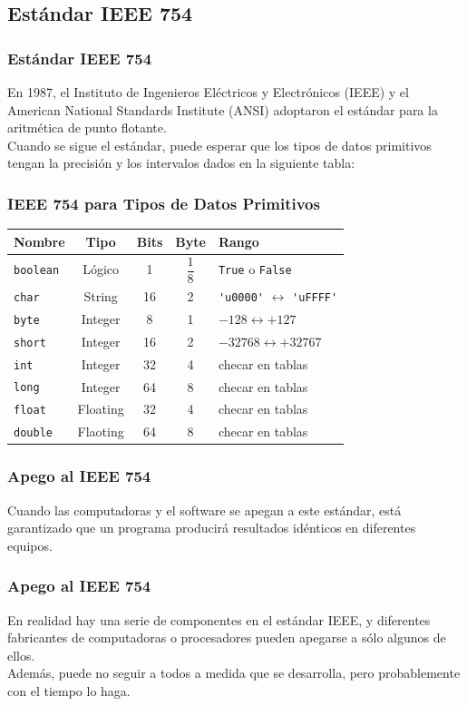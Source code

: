 \subsection{Estándar IEEE 754}
\begin{frame}
\frametitle{Estándar IEEE 754}
En 1987, el Instituto de Ingenieros Eléctricos y Electrónicos (IEEE) y el American National Standards Institute (ANSI) adoptaron el estándar  para la aritmética de punto flotante.
\\
\bigskip
Cuando se sigue el estándar, puede esperar que los tipos de datos primitivos tengan la precisión y los intervalos dados en la siguiente tabla:
\end{frame}
\begin{frame}[fragile]
\frametitle{IEEE 754 para Tipos de Datos Primitivos}
\begin{table}
\fontsize{10}{10}\selectfont
\begin{tabular}{l c c c l}
\hline
Nombre & Tipo & Bits & Byte & Rango \\ \hline
\texttt{boolean} & Lógico & 1 & $\dfrac{1}{8}$ & \texttt{True} o \texttt{False} \\ \hline
\texttt{char} & String & 16 & 2 & \verb|'u0000'| $\longleftrightarrow$ \verb|'uFFFF'| \\ \hline
\texttt{byte} & Integer & 8 & 1 & $-128 \longleftrightarrow +127$ \\ \hline
\texttt{short} & Integer & 16 & 2 & $-32768 \longleftrightarrow +32767$ \\ \hline
\texttt{int} & Integer & 32 & 4 & checar en tablas \\ \hline
\texttt{long} & Integer & 64 & 8 & checar en tablas \\ \hline
\texttt{float} & Floating & 32 & 4 & checar en tablas \\ \hline
\texttt{double} & Flaoting & 64 & 8 & checar en tablas \\ \hline
\end{tabular}
\end{table}
\end{frame}
\begin{frame}
\frametitle{Apego al IEEE 754}
 Cuando las computadoras y el software se apegan a este estándar, está garantizado que un programa producirá resultados idénticos en diferentes equipos.
 \end{frame}
 \begin{frame}
 \frametitle{Apego al IEEE 754}
 En realidad hay una serie de componentes en el estándar IEEE, y diferentes fabricantes de computadoras o procesadores pueden apegarse a sólo algunos de ellos.
 \\
 \bigskip
 Además, \python puede no seguir a todos a medida que se desarrolla, pero probablemente con el tiempo lo haga.
 \end{frame}
